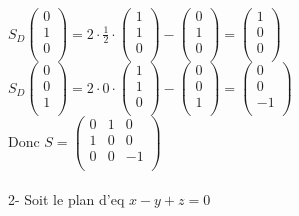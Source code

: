 \documentclass{article}
\begin{document}
$S_D\begin{pmatrix}
    0\\
    1\\
    0\\
\end{pmatrix} = 2 \cdot \frac{1}{2} \cdot \begin{pmatrix}
    1\\
    1\\
    0\\
\end{pmatrix} - \begin{pmatrix}
    0\\
    1\\
    0\\
\end{pmatrix} = \begin{pmatrix}
    1\\
    0\\
    0\\
\end{pmatrix}$\\
$S_D\begin{pmatrix}
    0\\
    0\\
    1\\
\end{pmatrix} = 2 \cdot 0 \cdot \begin{pmatrix}
    1\\
    1\\
    0\\
\end{pmatrix} - \begin{pmatrix}
    0\\
    0\\
    1\\
\end{pmatrix} = \begin{pmatrix}
    0\\
    0\\
    -1\\
\end{pmatrix}$\\
Donc $S = \begin{pmatrix}
    0 & 1 & 0\\
    1 & 0 & 0\\
    0 & 0 & -1\\
\end{pmatrix}$\\
\\
2- Soit le plan d'eq $x - y + z = 0$\\
\end{document}
